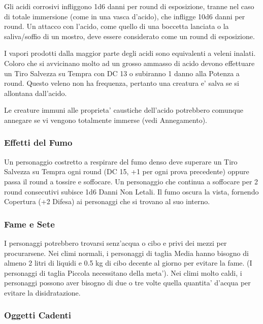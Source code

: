 \documentclass[a4paper,11pt,twoside,openany]{book}
\begin{document}
{\label{effetti-dellacido}

Gli acidi corrosivi infliggono 1d6 danni per round di esposizione, tranne nel caso di totale immersione (come in una vasca d'acido), che infligge 10d6 danni per round. Un attacco con l'acido, come quello di una boccetta lanciata o la saliva/soffio di un mostro, deve essere considerato come un round di esposizione.

I vapori prodotti dalla maggior parte degli acidi sono equivalenti a veleni inalati. Coloro che si avvicinano molto ad un grosso ammasso di acido devono effettuare un Tiro Salvezza su Tempra con DC 13 o subiranno 1 danno alla Potenza a round. Questo veleno non ha frequenza, pertanto una creatura e' salva se si allontana dall'acido.

Le creature immuni alle proprieta' caustiche dell'acido potrebbero comunque annegare se vi vengono totalmente immerse (vedi Annegamento).

\subsubsection{Effetti del Fumo}

\label{effetti-del-fumo}

Un personaggio costretto a respirare del fumo denso deve superare un Tiro Salvezza su Tempra ogni round (DC 15, +1 per ogni prova precedente) oppure passa il round a tossire e soffocare. Un personaggio che continua a soffocare per 2 round consecutivi subisce 1d6 Danni Non Letali. Il fumo oscura la vista, fornendo Copertura (+2 Difesa) ai personaggi che si trovano al suo interno.

\subsubsection{Fame e Sete}

\label{fame-e-sete}

I personaggi potrebbero trovarsi senz'acqua o cibo e privi dei mezzi per procurarsene. Nei climi normali, i personaggi di taglia Media hanno bisogno di almeno 2 litri di liquidi e 0.5 kg di cibo decente al giorno per evitare la fame. (I personaggi di taglia Piccola necessitano della meta'). Nei climi molto caldi, i personaggi possono aver bisogno di due o tre volte quella quantita' d'acqua per evitare la disidratazione.

\subsubsection{Oggetti Cadenti}

}
\end{document}
